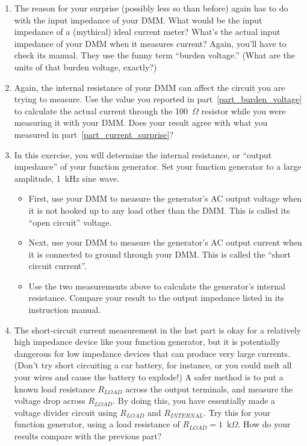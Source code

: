 \begin{enumerate}[wide]
\item The reason for your surprise (possibly less so than before) again has to do with the input impedance of your DMM.  What would be the input impedance of a (mythical) ideal current meter?  What's the actual input impedance of your DMM when it measures current?  Again, you'll have to check its manual.  They use the funny term ``burden voltage.''  (What are the units of that burden voltage, exactly?) \label{part_burden_voltage}

\item Again, the internal resistance of your DMM can affect the circuit you are trying to measure.  Use the value you reported in part~\ref{part_burden_voltage} to calculate the actual current through the 100~$\Omega$ resistor while you were measuring it with your DMM.  Does your result agree with what you measured in part~\ref{part_current_surprise}?

\item In this exercise, you will determine the internal resistance, or ``output impedance'' of your function generator.  Set your function generator to a large amplitude, 1~kHz sine wave.  

\begin{itemize}
\item First, use your DMM to measure the generator's AC output voltage when it is not hooked up to any load other than the DMM.  This is called its ``open circuit'' voltage.  

\item Next, use your DMM to measure the generator's AC output current when it is connected to ground through your DMM.  This is called the ``short circuit current''.   

\item Use the two measurements above to calculate the generator's internal resistance.  Compare your result to the output impedance listed in its instruction manual.
\end{itemize}

\item The short-circuit current measurement in the last part is okay for a relatively high impedance device like your function generator, but it is potentially dangerous for low impedance devices that can produce very large currents.  (Don't try short circuiting a car battery, for instance, or you could melt all your wires and cause the battery to explode!)  A safer method is to put a known load resistance $R_{LOAD}$ across the output terminals, and measure the voltage drop across $R_{LOAD}$.  By doing this, you have essentially made a voltage divider circuit using $R_{LOAD}$ and $R_{INTERNAL}$. Try this for your function generator, using a load resistance of $R_{LOAD} = 1$~k$\Omega$.  How do your results compare with the previous part? \label{part_func_gen_impedance}


\end{enumerate}

